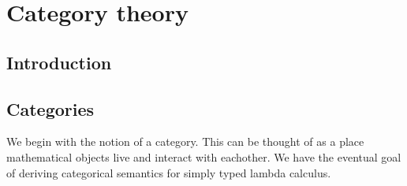\newcommand{\Ob}[1]{\text{Ob}(#1)}
\newcommand{\mc}[1]{\mathcal{#1}}

\section{Category theory}

\subsection{Introduction}




\subsection{Categories}

We begin with the notion of a category. This can be thought of as a place mathematical objects live and interact with eachother. We have the eventual goal of deriving categorical semantics for simply typed lambda calculus.


